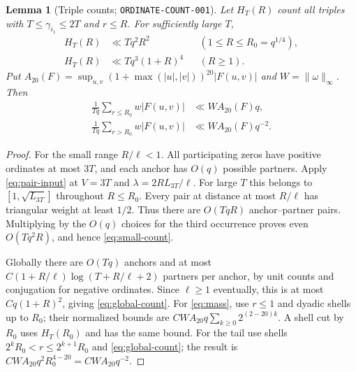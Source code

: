 \documentclass[11pt]{article}
\newtheorem{lemma}{Lemma}
\begin{document}
\begin{lemma}[Triple counts; \texttt{ORDINATE-COUNT-001}]
\label{lem:counts}
Let $H_T(R)$ count all triples with $T\leq\gamma_{i_1}\leq2T$
and $r\leq R$. For sufficiently large $T$,
\begin{align}
 H_T(R)&\ll Tq^2R^2 &&(1\leq R\leq R_0=q^{1/4}),\label{eq:small-count}\\
 H_T(R)&\ll Tq^3(1+R)^4 &&(R\geq1).\label{eq:global-count}
\end{align}
Put $A_{20}(F)=\sup_{u,v}(1+\max(|u|,|v|))^{20}|F(u,v)|$ and
$W=\|\omega\|_\infty$. Then
\begin{align}
 \frac1{Tq}\sum_{r\leq R_0}w|F(u,v)|&\ll WA_{20}(F)q,\label{eq:mass}\\
 \frac1{Tq}\sum_{r>R_0}w|F(u,v)|&\ll WA_{20}(F)q^{-2}.\label{eq:tail}
\end{align}
\end{lemma}
\begin{proof}
For the small range $R/\ell<1$. All participating zeros have positive
ordinates at most $3T$, and each anchor has $O(q)$ possible partners.
Apply \eqref{eq:pair-input} at $V=3T$ and
$\lambda=2RL_{3T}/\ell$. For large $T$ this belongs to
$[1,\sqrt{L_{3T}}]$ throughout $R\leq R_0$. Every pair at distance
at most $R/\ell$ has triangular weight at least $1/2$.
Thus there are $O(TqR)$ anchor--partner pairs. Multiplying by the
$O(q)$ choices for the third occurrence proves even $O(Tq^2R)$,
and hence \eqref{eq:small-count}.

Globally there are $O(Tq)$ anchors and at most
$C(1+R/\ell)\log(T+R/\ell+2)$ partners per anchor, by unit counts
and conjugation for negative ordinates. Since $\ell\geq1$ eventually,
this is at most $Cq(1+R)^2$, giving \eqref{eq:global-count}.
For \eqref{eq:mass}, use $r\leq1$ and dyadic shells up to $R_0$;
their normalized bounds are $CWA_{20}q\sum_{k\geq0}2^{(2-20)k}$.
A shell cut by $R_0$ uses $H_T(R_0)$ and has the same bound.
For the tail use shells $2^kR_0<r\leq2^{k+1}R_0$ and
\eqref{eq:global-count}; the result is
$CWA_{20}q^2R_0^{4-20}=CWA_{20}q^{-2}$.
\end{proof}
\end{document}
